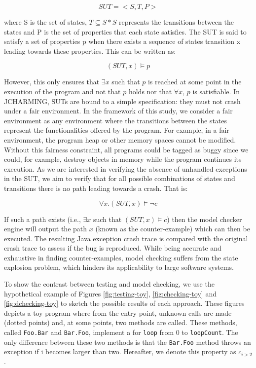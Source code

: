 \begin{equation}
SUT = <S,T,P>
\end{equation}

where S is the set of states, $T \subseteq S * S$ represents the transitions between the states and P is the set of properties that each state satisfies. The SUT is said to satisfy a set of properties p when there exists a sequence of states transition x leading towards these properties. This can be written as:

\begin{equation}
(SUT, x)  \models p
\end{equation}

However, this only ensures that $\exists x$ such that $p$ is reached at some point in the execution of the program and not that $p$ holds nor that $\forall x$, $p$ is satisfiable. In JCHARMING, SUTs are bound to a simple specification: they must not crash under a fair environment. In the framework of this study, we consider a fair environment as any environment where the transitions between the states represent the functionalities offered by the program. For example, in a fair environment, the program heap or other memory spaces cannot be modified. Without this fairness constraint, all programs could be tagged as buggy since we could, for example, destroy objects in memory while the program continues its execution. As we are interested in verifying the absence of unhandled exceptions in the SUT, we aim to verify that for all possible combinations of states and transitions there is no path leading towards a crash. That is:

\begin{equation}
\forall x.(SUT, x) \models \neg c
\end{equation}

If such a path exists (i.e., $\exists x$  such that $(SUT, x)  \models c$) then the model checker engine will output the path $x$ (known as the counter-example) which can then be executed. The resulting Java exception crash trace is compared with the original crash trace to assess if the bug is reproduced. While  being  accurate and exhaustive in finding counter-examples, model checking suffers from the state explosion problem, which hinders its applicability to large software systems.


To show the contrast between testing and model checking, we use the hypothetical example of Figures \ref{fig:testing-toy}, \ref{fig:checking-toy} and \ref{fig:dchecking-toy} to sketch the possible results of each approach. These figures depicts a toy program where from the entry point, unknown calls are made (dotted points) and, at some points, two methods are called. These methods, called \texttt{Foo.Bar} and \texttt{Bar.Foo}, implement a for \texttt{loop} from 0 to \texttt{loopCount}. The only difference between these two methods is that the \texttt{Bar.Foo} method throws an exception if i becomes larger than two. Hereafter, we denote this property as $c_{i > 2}$.  


